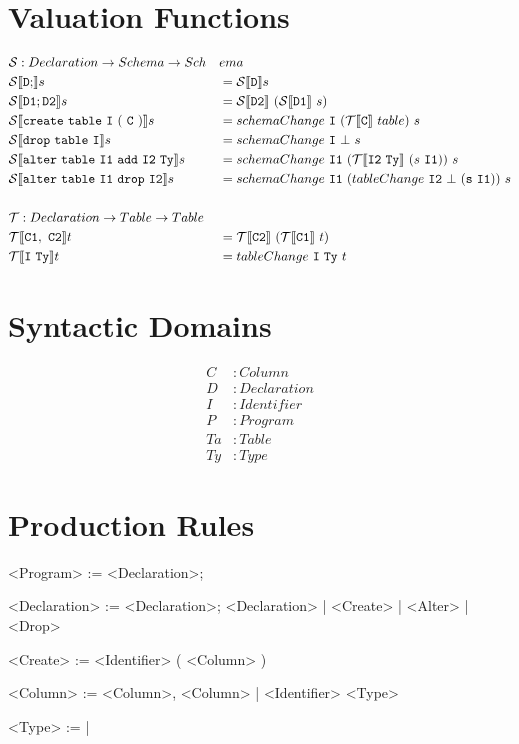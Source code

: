 \documentclass[12pt]{article}
\newcommand{\cmp}[2]{
  \mathcal{#1}|[ \mathtt{ \StrSubstitute{#2}{ }{\ } } |]
}
\begin{document}
\section{Valuation Functions}

\begin{alignat*}{2}
  &\mathcal{S} : Declaration -> Schema -> Sch&&ema \\
  &\cmp{S}{D;}s &&= \cmp{S}{D}s \\
  &\cmp{S}{D1;D2}s &&= \cmp{S}{D2}\ (\cmp{S}{D1}\ s) \\
  &\cmp{S}{create table I ( C )} s &&= schemaChange\ \mathtt{I}\ (\cmp{T}{C}\ table)\ s \\
  &\cmp{S}{drop table I}s &&= schemaChange\ \mathtt{I}\ \bot\ s \\
  &\cmp{S}{alter table I1 add I2 Ty}s &&= schemaChange\ \mathtt{I1}\ (\cmp{T}{\mathtt{I2} Ty}\ (s\ \mathtt{I1}))\ s\\
  &\cmp{S}{alter table I1 drop I2}s &&= schemaChange\ \mathtt{I1}\ (tableChange\ \mathtt{I2}\ \bot\ (\mathtt{s}\ \mathtt{I1}))\ s \\
\\
  &\mathcal{T} : Declaration -> Table -> Table && \\
  &\cmp{T}{C1, C2}t &&= \cmp{T}{C2}\ (\cmp{T}{C1}\ t) \\
  &\cmp{T}{I Ty}t &&= tableChange\ \mathtt{I}\ \mathtt{Ty}\ t \\
\end{alignat*}

\newpage

\section{Syntactic Domains}
\begin{align*}
  C &: Column \\
  D &: Declaration \\
  I &: Identifier \\
  P &: Program \\
  Ta &: Table \\
  Ty &: Type
\end{align*}

\section{Production Rules}
\begin{grammar}
  <Program> := <Declaration>;

  <Declaration> := <Declaration>; <Declaration> | <Create> | <Alter> | <Drop>

  <Create> :=  <Identifier> ( <Column> )

  <Column> := <Column>, <Column> | <Identifier> <Type>

  <Type> :=  | 
\end{grammar}
\end{document}
